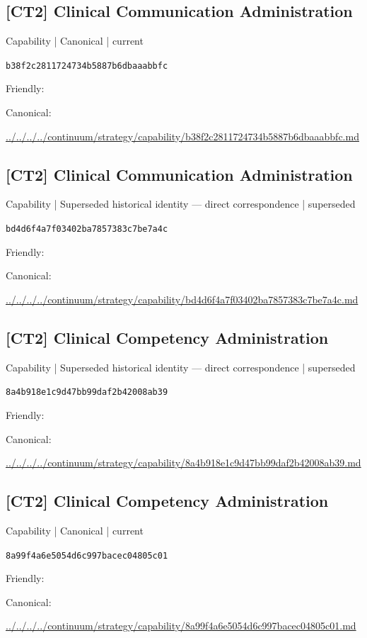 \documentclass[10pt,a4paper]{article}
\begin{document}
\subsection*{[CT2] Clinical Communication Administration}
{\small Capability | Canonical | current}\par
\texttt{b38f2c2811724734b5887b6dbaaabbfc}\par
Friendly: \par
Canonical: \par
{\footnotesize\url{../../../../continuum/strategy/capability/b38f2c2811724734b5887b6dbaaabbfc.md}}\par
\subsection*{[CT2] Clinical Communication Administration}
{\small Capability | Superseded historical identity — direct correspondence | superseded}\par
\texttt{bd4d6f4a7f03402ba7857383c7be7a4c}\par
Friendly: \par
Canonical: \par
{\footnotesize\url{../../../../continuum/strategy/capability/bd4d6f4a7f03402ba7857383c7be7a4c.md}}\par
\subsection*{[CT2] Clinical Competency Administration}
{\small Capability | Superseded historical identity — direct correspondence | superseded}\par
\texttt{8a4b918e1c9d47bb99daf2b42008ab39}\par
Friendly: \par
Canonical: \par
{\footnotesize\url{../../../../continuum/strategy/capability/8a4b918e1c9d47bb99daf2b42008ab39.md}}\par
\subsection*{[CT2] Clinical Competency Administration}
{\small Capability | Canonical | current}\par
\texttt{8a99f4a6e5054d6c997bacec04805c01}\par
Friendly: \par
Canonical: \par
{\footnotesize\url{../../../../continuum/strategy/capability/8a99f4a6e5054d6c997bacec04805c01.md}}\par
\end{document}

